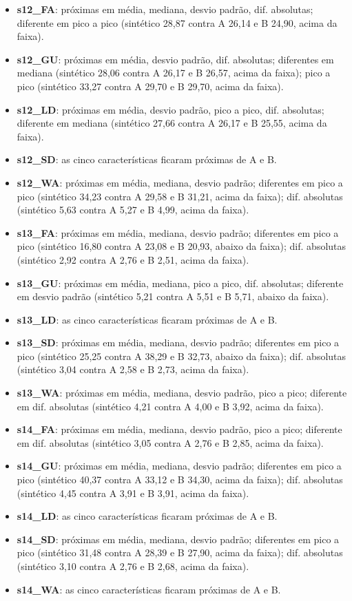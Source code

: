 \begin{itemize}
    \item \textbf{s12\_FA}: próximas em média, mediana, desvio padrão, dif. absolutas; diferente em pico a pico (sintético 28,87 contra A 26,14 e B 24,90, acima da faixa).
    \item \textbf{s12\_GU}: próximas em média, desvio padrão, dif. absolutas; diferentes em mediana (sintético 28,06 contra A 26,17 e B 26,57, acima da faixa); pico a pico (sintético 33,27 contra A 29,70 e B 29,70, acima da faixa).
    \item \textbf{s12\_LD}: próximas em média, desvio padrão, pico a pico, dif. absolutas; diferente em mediana (sintético 27,66 contra A 26,17 e B 25,55, acima da faixa).
    \item \textbf{s12\_SD}: as cinco características ficaram próximas de A e B.
    \item \textbf{s12\_WA}: próximas em média, mediana, desvio padrão; diferentes em pico a pico (sintético 34,23 contra A 29,58 e B 31,21, acima da faixa); dif. absolutas (sintético 5,63 contra A 5,27 e B 4,99, acima da faixa).
    \item \textbf{s13\_FA}: próximas em média, mediana, desvio padrão; diferentes em pico a pico (sintético 16,80 contra A 23,08 e B 20,93, abaixo da faixa); dif. absolutas (sintético 2,92 contra A 2,76 e B 2,51, acima da faixa).
    \item \textbf{s13\_GU}: próximas em média, mediana, pico a pico, dif. absolutas; diferente em desvio padrão (sintético 5,21 contra A 5,51 e B 5,71, abaixo da faixa).
    \item \textbf{s13\_LD}: as cinco características ficaram próximas de A e B.
    \item \textbf{s13\_SD}: próximas em média, mediana, desvio padrão; diferentes em pico a pico (sintético 25,25 contra A 38,29 e B 32,73, abaixo da faixa); dif. absolutas (sintético 3,04 contra A 2,58 e B 2,73, acima da faixa).
    \item \textbf{s13\_WA}: próximas em média, mediana, desvio padrão, pico a pico; diferente em dif. absolutas (sintético 4,21 contra A 4,00 e B 3,92, acima da faixa).
    \item \textbf{s14\_FA}: próximas em média, mediana, desvio padrão, pico a pico; diferente em dif. absolutas (sintético 3,05 contra A 2,76 e B 2,85, acima da faixa).
    \item \textbf{s14\_GU}: próximas em média, mediana, desvio padrão; diferentes em pico a pico (sintético 40,37 contra A 33,12 e B 34,30, acima da faixa); dif. absolutas (sintético 4,45 contra A 3,91 e B 3,91, acima da faixa).
    \item \textbf{s14\_LD}: as cinco características ficaram próximas de A e B.
    \item \textbf{s14\_SD}: próximas em média, mediana, desvio padrão; diferentes em pico a pico (sintético 31,48 contra A 28,39 e B 27,90, acima da faixa); dif. absolutas (sintético 3,10 contra A 2,76 e B 2,68, acima da faixa).
    \item \textbf{s14\_WA}: as cinco características ficaram próximas de A e B.
\end{itemize}
